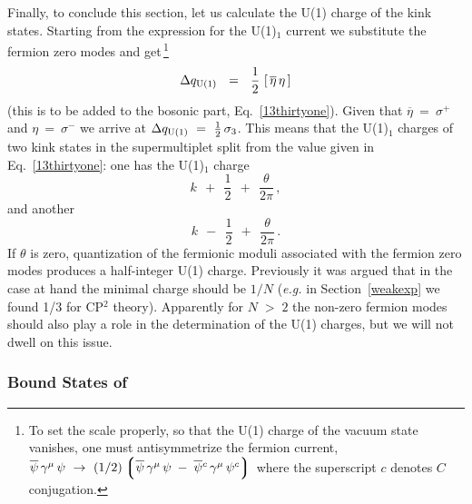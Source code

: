 \documentclass[epsfig,12pt]{article}
\def\beq{\begin{equation}}
\def\eeq{\end{equation}}
\def\beq{\begin{equation}}
\def\eeq{\end{equation}}
\newcommand{\ov}{\overline}
\newcommand{\lgr}{\left\lgroup}
\newcommand{\rgr}{\right\rgroup}
\newcommand{\bpsi}{\ov{\psi}{}}
\begin{document}
	Finally, to conclude this section, let us calculate the U(1) charge
	of the kink states. Starting from the expression  for the U(1)$_1$ current we
	substitute the fermion zero modes and get\,\footnote{To set the scale properly, so that
	the U(1) charge of the vacuum state vanishes, one must
	antisymmetrize
	the fermion current, 
	$ \bpsi\, \gamma^\mu\, \psi ~\to~ (1/2) \lgr \bpsi\, \gamma^\mu\, \psi \;-\; \bpsi{}^c\, \gamma^\mu\, \psi^c \rgr $ 
	where the superscript $c$ denotes $C$ conjugation.}
\beq
	\Delta q_{\rm U(1)}  ~~=~~  \frac{1}{2}\, \left[\, \ov{\eta}\, \eta \,\right]
\label{13fiftytwo}
\eeq
	(this is to be added to the bosonic part, Eq.~\eqref{13thirtyone}).
	Given that $ \ov{\eta} ~=~ \sigma^+ $ and $ \eta ~=~ \sigma^- $ we arrive at
	$ \Delta q_{\rm U(1)} ~=~ \frac{1}{2}\, \sigma_3 $. 
	This means that the U(1)$_1$ charges of two kink states in the supermultiplet
	split from the value given in Eq.~\eqref{13thirtyone}:
	one has the U(1)$_1$ charge
$$
	k  ~~+~~  \frac{1}{2}  ~~+~~  \frac{\theta}{2\pi}\,,
$$
and another
$$
	k  ~~-~~  \frac{1}{2} ~~+~~  \frac{\theta}{2\pi}\,.
$$
	If $ \theta $ is zero, quantization of the fermionic moduli associated with the fermion zero modes
	produces a half-integer U(1) charge. 
	Previously it was argued \cite{FeIn} that in the case at hand the minimal charge
	should be $ 1/N $ ({\it e.g.} in Section~\ref{weakexp} we found 1/3 for CP$^2$ theory). 
	Apparently for $ N \;>\; 2 $ the non-zero fermion modes should also play a role 
	in the determination of the U(1) charges, but we will not dwell on this issue.

\subsubsection[Bound States of $\psi^k$]
	{Bound States of }
\label{bound}
\end{document}
